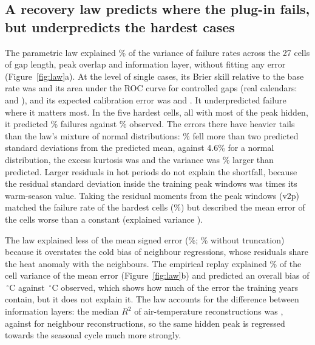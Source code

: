 \documentclass[draft]{agujournal2025}
\begin{document}
\subsection{A recovery law predicts where the plug-in fails, but underpredicts the hardest cases}
The parametric law explained \TLawCellFailEV\% of the variance of failure rates across the 27 cells of gap length, peak overlap and information layer, without fitting any error (Figure~\ref{fig:law}a). At the level of single cases, its Brier skill relative to the base rate was \TLawBrierSkillMech{} and its area under the ROC curve \TLawAucMech{} for controlled gaps (real calendars: \TLawBrierSkillDeploy{} and \TLawAucDeploy), and its expected calibration error was \TLawEceMech{} and \TLawEceDeploy. It underpredicted failure where it matters most. In the five hardest cells, all with most of the peak hidden, it predicted \THardVTwo\% failures against \THardObserved\% observed. The errors there have heavier tails than the law's mixture of normal distributions: \THardBeyond\% fell more than two predicted standard deviations from the predicted mean, against 4.6\% for a normal distribution, the excess kurtosis was \THardKurtosis{} and the variance was \THardVariance\% larger than predicted. Larger residuals in hot periods do not explain the shortfall, because the residual standard deviation inside the training peak windows was \THardHetero{} times its warm-season value. Taking the residual moments from the peak windows (v2p) matched the failure rate of the hardest cells (\THardVTwoP\%) but described the mean error of the cells worse than a constant (explained variance \TVTwoPCellBiasEV).

The law explained less of the mean signed error (\TLawCellBiasEV\%; \TLawCellBiasEVUntruncated\% without truncation) because it overstates the cold bias of neighbour regressions, whose residuals share the heat anomaly with the neighbours. The empirical replay explained \TReplayCellBiasEV\% of the cell variance of the mean error (Figure~\ref{fig:law}b) and predicted an overall bias of \TReplayBiasMech\,$^{\circ}$C against \TObservedBiasMech\,$^{\circ}$C observed, which shows how much of the error the training years contain, but it does not explain it. The law accounts for the difference between information layers: the median $R^2$ of air-temperature reconstructions was \TLawRTwoAir{}, against \TLawRTwoDonor{} for neighbour reconstructions, so the same hidden peak is regressed towards the seasonal cycle much more strongly.
\end{document}
